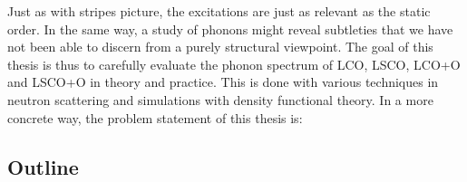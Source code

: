 Just as with stripes picture, the excitations are just as relevant as the static order. In the same way, a study of phonons might reveal subtleties that we have not been able to discern from a purely structural viewpoint. The goal of this thesis is thus to carefully evaluate the phonon spectrum of LCO, LSCO, LCO+O and LSCO+O in theory and practice. This is done with various techniques in neutron scattering and simulations with density functional theory. In a more concrete way, the problem statement of this thesis is:

\begin{quote}
\end{quote}

\subsection{Outline}
